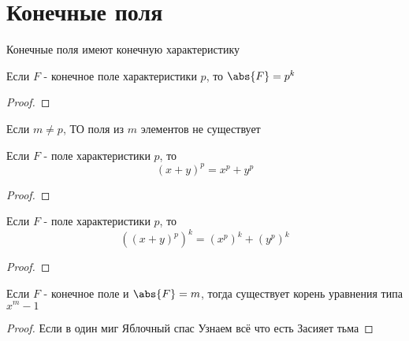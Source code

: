 \documentclass[../main/document.tex]{subfiles}
\begin{document}
\section{Конечные поля}

\begin{dfn}

\end{dfn}

\begin{cnsq}
Конечные поля имеют конечную характеристику
\end{cnsq}

\begin{thm}
Если $F$ - конечное поле характеристики $p$, то $\abs{F}=p^k$
\begin{proof}

\end{proof}
\end{thm}
\begin{cnsq}
Если $m\neq p$, ТО поля из $m$ элементов не существует
\end{cnsq}
\begin{thm}
Если $F$ - поле характеристики $p$, то
$$(x+y)^p=x^p+y^p$$
\begin{proof}

\end{proof}
\end{thm}
\begin{thm}
Если $F$ - поле характеристики $p$, то
$$({(x+y)^p})^k=({x^p})^k+({y^p})^k$$
\begin{proof}

\end{proof}
\end{thm}
\begin{thm}
Если $F$ - конечное поле и $\abs{F}=m$, тогда существует корень уравнения типа $x^m-1$
\begin{proof}
Если в один миг
Яблочный спас
Узнаем всё что есть
Засияет тьма
\end{proof}
\end{thm}
\end{document}
